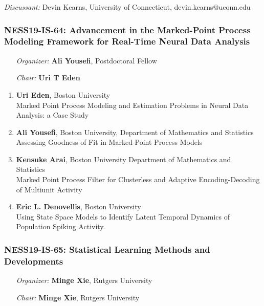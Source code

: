 \emph{Discussant:} Devin Kearns, University of Connecticut, devin.kearns@uconn.edu

\subsubsection*{NESS19-IS-64: Advancement in the Marked-Point Process Modeling Framework for Real-Time Neural Data Analysis}

\begin{enumerate}[align=left]
\item [\emph{Organizer:}] \textbf{Ali Yousefi}, Postdoctoral Fellow \\
\item [\emph{Chair:}] \textbf{Uri T Eden}
\end{enumerate}

\begin{enumerate}
\item \textbf{Uri Eden}, Boston University \\
Marked Point Process Modeling and Estimation Problems in Neural Data Analysis: a Case Study
\item \textbf{Ali Yousefi}, Boston University, Department of Mathematics and Statistics \\
Assessing Goodness of Fit in Marked-Point Process Models
\item \textbf{Kensuke Arai}, Boston University Department of Mathematics and Statistics \\
Marked Point Process Filter for Clusterless and Adaptive Encoding-Decoding of Multiunit Activity
\item \textbf{Eric L. Denovellis}, Boston University \\
Using State Space Models to Identify Latent Temporal Dynamics of Population Spiking Activity.
\end{enumerate}

\subsubsection*{NESS19-IS-65: Statistical Learning Methods and Developments}

\begin{enumerate}[align=left]
\item [\emph{Organizer:}] \textbf{Minge Xie}, Rutgers University \\
\item [\emph{Chair:}] \textbf{Minge Xie}, Rutgers University
\end{enumerate}

